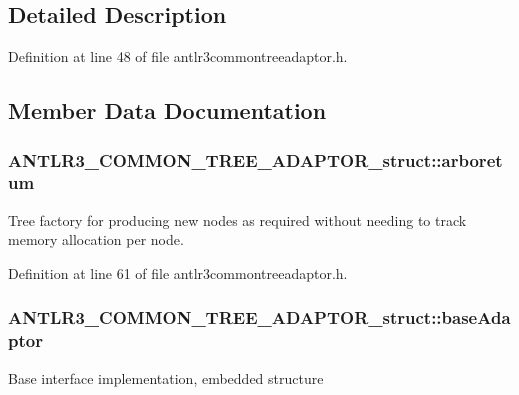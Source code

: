 \subsection{Detailed Description}


Definition at line 48 of file antlr3commontreeadaptor.\-h.



\subsection{Member Data Documentation}
\hypertarget{struct_a_n_t_l_r3___c_o_m_m_o_n___t_r_e_e___a_d_a_p_t_o_r__struct_ac28fb32f402da751776131d34e83b8a2}{
\subsubsection[{arboretum}]{ A\-N\-T\-L\-R3\-\_\-\-C\-O\-M\-M\-O\-N\-\_\-\-T\-R\-E\-E\-\_\-\-A\-D\-A\-P\-T\-O\-R\-\_\-struct\-::arboretum}}\label{struct_a_n_t_l_r3___c_o_m_m_o_n___t_r_e_e___a_d_a_p_t_o_r__struct_ac28fb32f402da751776131d34e83b8a2}
Tree factory for producing new nodes as required without needing to track memory allocation per node. 

Definition at line 61 of file antlr3commontreeadaptor.\-h.

\hypertarget{struct_a_n_t_l_r3___c_o_m_m_o_n___t_r_e_e___a_d_a_p_t_o_r__struct_ab7b3f2c6b6fc9cf9085e5f8ec4dab465}{
\subsubsection[{base\-Adaptor}]{ A\-N\-T\-L\-R3\-\_\-\-C\-O\-M\-M\-O\-N\-\_\-\-T\-R\-E\-E\-\_\-\-A\-D\-A\-P\-T\-O\-R\-\_\-struct\-::base\-Adaptor}}\label{struct_a_n_t_l_r3___c_o_m_m_o_n___t_r_e_e___a_d_a_p_t_o_r__struct_ab7b3f2c6b6fc9cf9085e5f8ec4dab465}
Base interface implementation, embedded structure 

